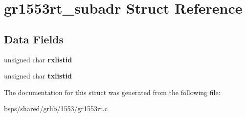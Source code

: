 \hypertarget{structgr1553rt__subadr}{}\section{gr1553rt\+\_\+subadr Struct Reference}
\label{structgr1553rt__subadr}
\subsection*{Data Fields}
\begin{DoxyCompactItemize}
\item 
\mbox{\label{structgr1553rt__subadr_af5d0ff02730657054f3da0a68ad15120}} 
unsigned char {\bfseries rxlistid}
\item 
\mbox{\label{structgr1553rt__subadr_ad194de60445c54526725f706441c24b9}} 
unsigned char {\bfseries txlistid}
\end{DoxyCompactItemize}


The documentation for this struct was generated from the following file\+:\begin{DoxyCompactItemize}
\item 
bsps/shared/grlib/1553/gr1553rt.\+c\end{DoxyCompactItemize}
